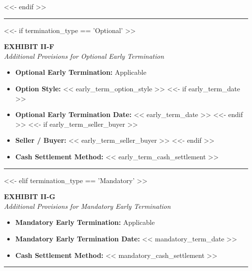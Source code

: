 \documentclass[11pt, a4paper]{article}
\begin{document}
<<- endif >>

\vspace{0.5cm}
\hrule
\vspace{0.5cm}


<<- if termination_type == 'Optional' >>
\begin{center}
    \textbf{EXHIBIT II-F} \\
    \textit{Additional Provisions for Optional Early Termination}
\end{center}

\begin{itemize}[leftmargin=2cm, label={}, itemsep=3pt]
    \item \textbf{Optional Early Termination:} Applicable
    \item \textbf{Option Style:} << early_term_option_style >>
<<- if early_term_date >>
    \item \textbf{Optional Early Termination Date:} << early_term_date >>
<<- endif >>
<<- if early_term_seller_buyer >>
    \item \textbf{Seller / Buyer:} << early_term_seller_buyer >>
<<- endif >>
    \item \textbf{Cash Settlement Method:} << early_term_cash_settlement >>
\end{itemize}

\vspace{0.5cm}
\hrule
\vspace{0.5cm}

<<- elif termination_type == 'Mandatory' >>
\begin{center}
    \textbf{EXHIBIT II-G} \\
    \textit{Additional Provisions for Mandatory Early Termination}
\end{center}

\begin{itemize}[leftmargin=2cm, label={}, itemsep=3pt]
    \item \textbf{Mandatory Early Termination:} Applicable
    \item \textbf{Mandatory Early Termination Date:} << mandatory_term_date >>
    \item \textbf{Cash Settlement Method:} << mandatory_cash_settlement >>
\end{itemize}

\vspace{0.5cm}
\hrule
\vspace{0.5cm}
\end{document}

